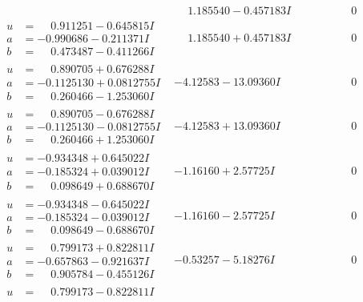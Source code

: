 \documentclass[1p]{elsarticle_modified}
\theoremstyle{definition}
\begin{document}
$$\begin{array}{c|c|c}
 & \phantom{-}1.185540 - 0.457183 I & \phantom{-0.000000 } 0 \\ \hline\begin{aligned}
u &= \phantom{-}0.911251 - 0.645815 I \\
a &= -0.990686 - 0.211371 I \\
b &= \phantom{-}0.473487 - 0.411266 I\end{aligned}
 & \phantom{-}1.185540 + 0.457183 I & \phantom{-0.000000 } 0 \\ \hline\begin{aligned}
u &= \phantom{-}0.890705 + 0.676288 I \\
a &= -0.1125130 + 0.0812755 I \\
b &= \phantom{-}0.260466 - 1.253060 I\end{aligned}
 & -4.12583 - 13.09360 I & \phantom{-0.000000 } 0 \\ \hline\begin{aligned}
u &= \phantom{-}0.890705 - 0.676288 I \\
a &= -0.1125130 - 0.0812755 I \\
b &= \phantom{-}0.260466 + 1.253060 I\end{aligned}
 & -4.12583 + 13.09360 I & \phantom{-0.000000 } 0 \\ \hline\begin{aligned}
u &= -0.934348 + 0.645022 I \\
a &= -0.185324 + 0.039012 I \\
b &= \phantom{-}0.098649 + 0.688670 I\end{aligned}
 & -1.16160 + 2.57725 I & \phantom{-0.000000 } 0 \\ \hline\begin{aligned}
u &= -0.934348 - 0.645022 I \\
a &= -0.185324 - 0.039012 I \\
b &= \phantom{-}0.098649 - 0.688670 I\end{aligned}
 & -1.16160 - 2.57725 I & \phantom{-0.000000 } 0 \\ \hline\begin{aligned}
u &= \phantom{-}0.799173 + 0.822811 I \\
a &= -0.657863 - 0.921637 I \\
b &= \phantom{-}0.905784 - 0.455126 I\end{aligned}
 & -0.53257 - 5.18276 I & \phantom{-0.000000 } 0 \\ \hline\begin{aligned}
u &= \phantom{-}0.799173 - 0.822811 I \\

\end{aligned}
\end{array}$$
\end{document}
